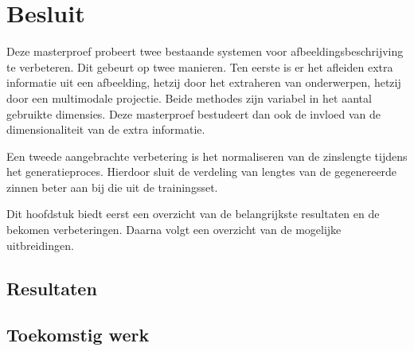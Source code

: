 \chapter{Besluit}
\label{besluit}
Deze masterproef probeert twee bestaande systemen voor afbeeldingsbeschrijving te verbeteren. Dit gebeurt op twee manieren. Ten eerste is er het afleiden extra informatie uit een afbeelding, hetzij door het extraheren van onderwerpen, hetzij door een multimodale projectie. Beide methodes zijn variabel in het aantal gebruikte dimensies. Deze masterproef bestudeert dan ook de invloed van de dimensionaliteit van de extra informatie. 

Een tweede aangebrachte verbetering is het normaliseren van de zinslengte tijdens het generatieproces. Hierdoor sluit de verdeling van lengtes van de gegenereerde zinnen beter aan bij die uit de trainingsset. 

Dit hoofdstuk biedt eerst een overzicht van de belangrijkste resultaten en de bekomen verbeteringen. Daarna volgt een overzicht van de mogelijke uitbreidingen.
\section{Resultaten}
\section{Toekomstig werk}

